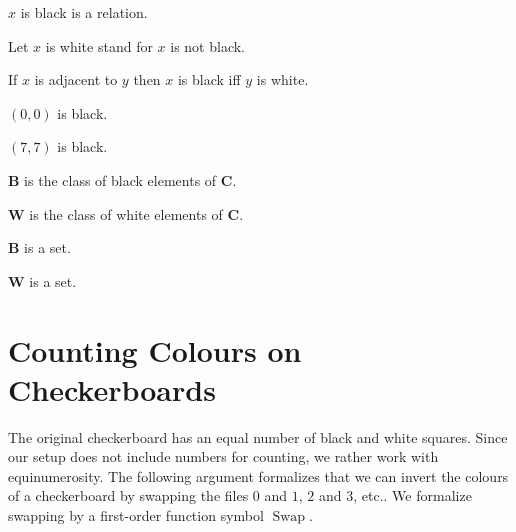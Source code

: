 \documentclass{article}
\newcommand{\Checkerboard}{\mathbf{C}}
\newcommand{\Black}{\mathbf{B}}
\newcommand{\White}{\mathbf{W}}
\newcommand{\Swap}[1]{\operatorname{Swap}#1}
\begin{document}
\begin{forthel}
    \begin{signature} $x$ is black is a relation. \end{signature}
    Let $x$ is white stand for $x$ is not black.

    \begin{axiom} If $x$ is adjacent to $y$ then $x$ is black iff $y$ is white. \end{axiom}

    \begin{axiom} $(0,0)$ is black. \end{axiom}
    \begin{axiom} $(7,7)$ is black. \end{axiom}

    \begin{definition} $\Black$ is the class of black elements of $\Checkerboard$. \end{definition}
    \begin{definition} $\White$ is the class of white elements of $\Checkerboard$. \end{definition}

    \begin{lemma} $\Black$ is a set. \end{lemma}
    \begin{lemma} $\White$ is a set. \end{lemma}
\end{forthel}


\section{Counting Colours on Checkerboards}

The original checkerboard has an equal number of black and white squares.
Since our setup does not include numbers for counting, we rather work with
equinumerosity. The following argument formalizes that we can invert the
colours of a checkerboard by swapping the files $0$ and $1$, $2$ and $3$, etc..
We formalize swapping by a first-order function symbol $\Swap{}$.
\end{document}
